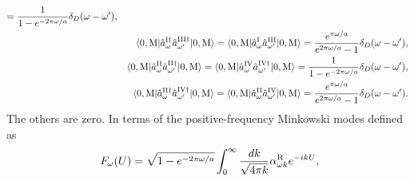 \documentclass[aps,prd,preprintnumbers,nofootinbib,showpacs,11pt]{revtex4}%
\begin{document}
\begin{widetext}
\begin{eqnarray}
={1\over 1- e^{-2\pi\omega/a} }\delta_D(\omega-\omega'),
\nonumber
\\
&&\langle0,{\rm M}|\hat a_{\omega}^{\rm I \dagger}\hat a_{\omega'}^{\rm III \dagger}|0,{\rm M}\rangle
= \langle0,{\rm M}|\hat a_{\omega}^{\rm I }\hat a_{\omega'}^{\rm III}|0,{\rm M}\rangle
={e^{\pi\omega/a}\over e^{2\pi\omega/a}-1}\delta_D(\omega-\omega'),
\nonumber
\\
&& \langle0,{\rm M}|\hat a_{\omega}^{\rm II}\hat a_{\omega'}^{\rm II \dagger}|0,{\rm M}\rangle
=\langle0,{\rm M}|\hat a_{\omega}^{\rm IV}\hat a_{\omega'}^{\rm IV \dagger}|0,{\rm M}\rangle
={1\over 1- e^{-2\pi\omega/a} }\delta_D(\omega-\omega'),
\nonumber
\\
&&\langle0,{\rm M}|\hat a_{\omega}^{\rm II \dagger}\hat a_{\omega'}^{\rm IV \dagger}|0,{\rm M}\rangle
= \langle0,{\rm M}|\hat a_{\omega}^{\rm II }\hat a_{\omega'}^{\rm IV}|0,{\rm M}\rangle
={e^{\pi\omega/a}\over e^{2\pi\omega/a}-1}\delta_D(\omega-\omega') .
\nonumber
\\
\end{eqnarray}
The others are zero. 
In terms of the positive-frequency Minkowski  modes defined as 
\begin{eqnarray}
&&F_\omega(U)=\sqrt{1-e^{-2\pi\omega/a}}\int_0^\infty {dk\over \sqrt{4\pi k}} \alpha_{\omega k}^{\rm R} e^{-ik U},
\hspace{2mm}

\end{eqnarray}
\end{widetext}
\end{document}
